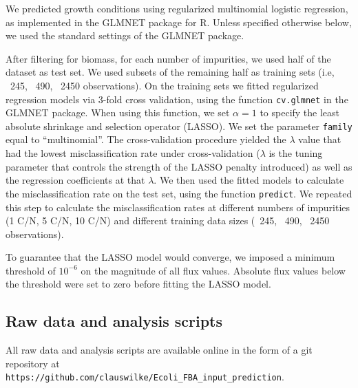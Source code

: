 \documentclass[12pt]{article}
\begin{document}
We predicted growth conditions using regularized multinomial logistic regression, as implemented in the GLMNET package \cite{Friedmanetal2010} for R. Unless specified otherwise below, we used the standard settings of the GLMNET package.

After filtering for biomass, for each number of impurities, we used half of the dataset as test set. We used subsets of the remaining half as training sets (i.e, ~245, ~490, ~2450 observations). On the training sets we fitted regularized regression models via 3-fold cross validation, using the function \texttt{cv.glmnet} in the GLMNET package. When using this function, we set $\alpha=1$ to specify the least absolute shrinkage and selection operator (LASSO). We set the parameter \texttt{family} equal to ``multinomial''. The cross-validation procedure yielded the  $\lambda$ value that had the lowest misclassification rate under cross-validation ($\lambda$ is the tuning parameter that controls the strength of the LASSO penalty introduced) as well as the regression coefficients at that $\lambda$. We then used the fitted models to calculate the misclassification rate on the test set, using the function \texttt{predict}. We repeated this step to calculate the misclassification rates at different numbers of impurities (1 C/N, 5 C/N, 10 C/N) and different training data sizes (~245, ~490, ~2450 observations).

To guarantee that the LASSO model would converge, we imposed a minimum threshold of $10^{-6}$ on the magnitude of all flux values. Absolute flux values below the threshold were set to zero before fitting the LASSO model.

\subsection{Raw data and analysis scripts}

All raw data and analysis scripts are available online in the form of a git repository at\\ \texttt{https://github.com/clauswilke/Ecoli\_FBA\_input\_prediction}.


\end{document}
